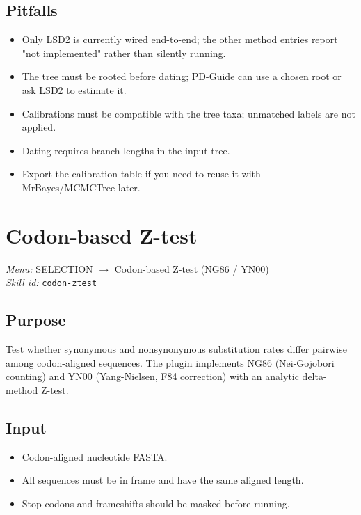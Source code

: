 \documentclass[11pt]{report}
\begin{document}
\subsection{Pitfalls}

\begin{itemize}
  \item Only LSD2 is currently wired end-to-end; the other method entries report "not implemented" rather than silently running.
  \item The tree must be rooted before dating; PD-Guide can use a chosen root or ask LSD2 to estimate it.
  \item Calibrations must be compatible with the tree taxa; unmatched labels are not applied.
  \item Dating requires branch lengths in the input tree.
  \item Export the calibration table if you need to reuse it with MrBayes/MCMCTree later.
\end{itemize}


\section{Codon-based Z-test}
\noindent\textit{Menu:} SELECTION $\rightarrow$ Codon-based Z-test (NG86 / YN00)\\
\noindent\textit{Skill id:} \texttt{codon-ztest}

\subsection{Purpose}

Test whether synonymous and nonsynonymous substitution rates differ pairwise among codon-aligned sequences. The plugin implements NG86 (Nei-Gojobori counting) and YN00 (Yang-Nielsen, F84 correction) with an analytic delta-method Z-test.

\subsection{Input}

\begin{itemize}
  \item Codon-aligned nucleotide FASTA.
  \item All sequences must be in frame and have the same aligned length.
  \item Stop codons and frameshifts should be masked before running.
\end{itemize}
\end{document}
